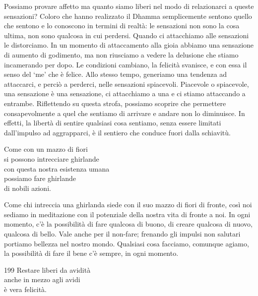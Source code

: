 \begin{dhpRefl}
Possiamo provare affetto ma quanto siamo liberi nel modo di relazionarci a queste sensazioni? Coloro che hanno realizzato il Dhamma semplicemente sentono quello che sentono e lo conoscono in termini di realt\`{a}: le sensazioni non sono la cosa ultima, non sono qualcosa in cui perdersi. Quando ci attacchiamo alle sensazioni le distorciamo. In un momento di attaccamento alla gioia abbiamo una sensazione di aumento di godimento, ma non riusciamo a vedere la delusione che stiamo incamerando per dopo. Le condizioni cambiano, la felicit\`{a} svanisce, e con essa il senso del `me' che \`{e} felice. Allo stesso tempo, generiamo una tendenza ad attaccarci, e perci\`{o} a perderci, nelle sensazioni spiacevoli. Piacevole o spiacevole, una sensazione \`{e} una sensazione, ci attacchiamo a una e ci stiamo attaccando a entrambe. Riflettendo su questa strofa, possiamo scoprire che permettere consapevolmente a quel che sentiamo di arrivare e andare non lo diminuisce. In effetti, la libert\`{a} di sentire qualsiasi cosa sentiamo, senza essere limitati dall'impulso ad aggrapparci, \`{e} il sentiero che conduce fuori dalla schiavitù.
\end{dhpRefl}


\begin{dhpVerse}{53}
\label{dhp-53}
Come con un mazzo di fiori\\
si possono intrecciare ghirlande\\
con questa nostra esistenza umana\\
possiamo fare ghirlande\\
di nobili azioni.
\end{dhpVerse}

\begin{dhpRefl}
Come chi intreccia una ghirlanda siede con il suo mazzo di fiori di fronte, così noi sediamo in meditazione con il potenziale della nostra vita di fronte a noi. In ogni momento, c'\`{e} la possibilit\`{a} di fare qualcosa di buono, di creare qualcosa di nuovo, qualcosa di bello. Vale anche per il non-fare; frenando gli impulsi non salutari portiamo bellezza nel nostro mondo. Qualsiasi cosa facciamo, comunque agiamo, la possibilit\`{a} di fare il bene c'\`{e} sempre, in ogni momento.
\end{dhpRefl}


\begin{dhpVerse}{199}
\label{dhp-199}
Restare liberi da avidit\`{a}\\
anche in mezzo agli avidi\\
\`{e} vera felicit\`{a}.
\end{dhpVerse}


